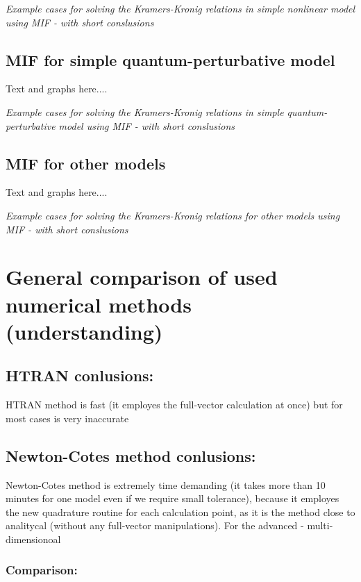 \documentclass[12pt,twoside,a4paper]{article}
\numberwithin{equation}{subsection}
\numberwithin{figure}{subsection}
\begin{document}
\textit{Example cases for solving the Kramers-Kronig relations in simple nonlinear model using MIF - with short conslusions}

\subsection{MIF for simple quantum-perturbative model} \label{chap:matlab_quantum}

Text and graphs here.... 

\textit{Example cases for solving the Kramers-Kronig relations in simple quantum-perturbative model using MIF - with short
conslusions}

\subsection{MIF for other models} \label{chap:matlab_other}

Text and graphs here.... 

\textit{Example cases for solving the Kramers-Kronig relations for other models using MIF - with short conslusions}

\section{General comparison of used numerical methods (understanding)} \label{chap:comparison}

\subsection*{HTRAN conlusions:} \label{chap:comparison_htran}

HTRAN method is fast (it employes the full-vector calculation at once) but for most cases is very inaccurate 

\subsection*{Newton-Cotes method conlusions:} \label{chap:comparison_nc}

Newton-Cotes method is extremely time demanding (it takes more than 10 minutes for one model even if we require small tolerance),
because it employes the new quadrature routine for each calculation point, as it is the method close to analitycal (without any
full-vector manipulations). For the advanced - multi-dimensionoal

\subsubsection*{Comparison:}
\end{document}
